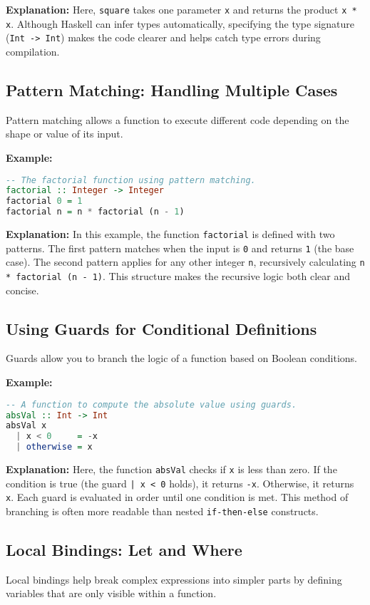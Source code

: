 \documentclass[11pt,a4paper]{article}
\begin{document}
\textbf{Explanation:}  
Here, \texttt{square} takes one parameter \texttt{x} and returns the product \texttt{x * x}. Although Haskell can infer types automatically, specifying the type signature (\texttt{Int -> Int}) makes the code clearer and helps catch type errors during compilation.

\subsection{Pattern Matching: Handling Multiple Cases}
Pattern matching allows a function to execute different code depending on the shape or value of its input.

\textbf{Example:}
\begin{lstlisting}[language=Haskell]
-- The factorial function using pattern matching.
factorial :: Integer -> Integer
factorial 0 = 1
factorial n = n * factorial (n - 1)
\end{lstlisting}

\textbf{Explanation:}  
In this example, the function \texttt{factorial} is defined with two patterns. The first pattern matches when the input is \texttt{0} and returns \texttt{1} (the base case). The second pattern applies for any other integer \texttt{n}, recursively calculating \texttt{n * factorial (n - 1)}. This structure makes the recursive logic both clear and concise.

\subsection{Using Guards for Conditional Definitions}
Guards allow you to branch the logic of a function based on Boolean conditions.

\textbf{Example:}
\begin{lstlisting}[language=Haskell]
-- A function to compute the absolute value using guards.
absVal :: Int -> Int
absVal x
  | x < 0     = -x
  | otherwise = x
\end{lstlisting}

\textbf{Explanation:}  
Here, the function \texttt{absVal} checks if \texttt{x} is less than zero. If the condition is true (the guard \texttt{| x < 0} holds), it returns \texttt{-x}. Otherwise, it returns \texttt{x}. Each guard is evaluated in order until one condition is met. This method of branching is often more readable than nested \texttt{if-then-else} constructs.

\subsection{Local Bindings: Let and Where}
Local bindings help break complex expressions into simpler parts by defining variables that are only visible within a function.
\end{document}
